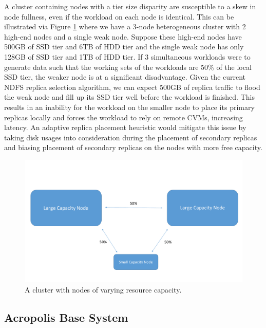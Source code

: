 \documentclass[12pt]{article}
\begin{document}
    A cluster containing nodes with a tier size disparity are susceptible to a
    skew in node fullness, even if the workload on each node is identical. This
    can be illustrated via Figure \ref{fig:tier_size_disparity} where we have a
    3-node heterogeneous cluster with 2 high-end nodes and a single weak node.
    Suppose these high-end nodes have 500GB of SSD tier and 6TB of HDD tier and
    the single weak node has only 128GB of SSD tier and 1TB of HDD tier. If 3
    simultaneous workloads were to generate data such that the working sets of
    the workloads are 50\% of the local SSD tier, the weaker node is at a
    significant disadvantage. Given the current NDFS replica selection
    algorithm, we can expect 500GB of replica traffic to flood the weak node
    and fill up its SSD tier well before the workload is finished. This results
    in an inability for the workload on the smaller node to place its primary
    replicas locally and forces the workload to rely on remote CVMs, increasing
    latency. An adaptive replica placement heuristic would mitigate this issue
    by taking disk usages into consideration during the placement of secondary
    replicas and biasing placement of secondary replicas on the nodes with more
    free capacity.

    \begin{figure}[h]
      \centering
      \includegraphics[scale=0.4]{images/homogeneous_tier_disparity.pdf} 
      \caption{A cluster with nodes of varying resource capacity.}
      \label{fig:tier_size_disparity}
    \end{figure}

  \subsection{Acropolis Base System}
\end{document}
